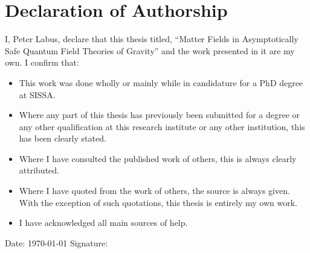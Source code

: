 \documentclass[11pt]{book}
\numberwithin{equation}{chapter}
\begin{document}

\chapter*{Declaration of Authorship}

\noindent I, Peter Labus, declare that this thesis titled,
``Matter Fields in Asymptotically Safe Quantum Field Theories of Gravity''
and the work presented in it are my own. I confirm that:
\vfill

\begin{itemize}
\item This work was done wholly or mainly while in candidature for a PhD degree at SISSA.
\vfill
\item Where any part of this thesis has previously been submitted for a degree or any
  other qualification at this research institute or any other institution, this has been clearly stated.
\vfill
\item Where I have consulted the published work of others, this is always clearly attributed.
\vfill
\item Where I have quoted from the work of others, the source is always given.
  With the exception of such quotations, this thesis is entirely my own work.
\vfill
\item I have acknowledged all main sources of help.
\end{itemize}
\vfill

\noindent Date: \dateall\today%
\hspace{4cm} Signature:\\
\end{document}
